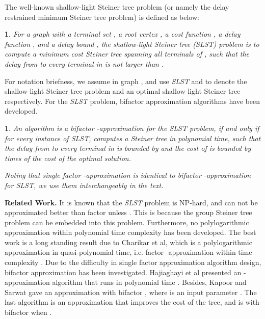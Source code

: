 \documentclass[english,runningheads,a4paper]{llncs}
\newtheorem{defn}[thm]{\protect\definitionname}
\providecommand{\definitionname}{Definition}
\begin{document}
The well-known shallow-light Steiner tree problem (or namely the delay
restrained minimum Steiner tree problem) is defined as below:
\begin{defn}
For a graph  with a terminal set , a root vertex
, a cost function , a delay function
, and a delay bound , the\emph{
shallow-light Steiner tree (SLST) problem} is to compute a minimum
cost Steiner tree  spanning all terminals of , such that
the delay from  to every terminal in  is not larger than
.
\end{defn}
For notation briefness, we assume  in graph
, and use \emph{SLST }and\emph{ } to denote the shallow-light
Steiner tree problem and an optimal shallow-light Steiner tree respectively.
 For the \emph{SLST} problem, bifactor approximation algorithms have
been developed.
\begin{defn}
An algorithm  is a bifactor -approximation
for the \emph{SLST} problem, if and only if for every instance of
\emph{SLST, } computes a Steiner tree  in polynomial time,
such that the delay from  to every terminal in  is bounded
by  and the cost of  is bounded by  times
of the cost of the optimal solution.

Noting that single factor -approximation is identical to bifactor
-approximation for \emph{SLST}, we use them
interchangeably in the text.
\end{defn}
\textbf{Related Work.} It is known that the \emph{SLST} problem is
NP-hard, and can not be approximated better than factor 
unless  \cite{khandekar2013some}.
This is because the group Steiner tree problem can be embedded into
this problem. Furthermore, no polylogarithmic approximation within
polynomial time complexity has been developed. The best work is a
long standing result due to Charikar et al, which is a polylogarithmic
approximation in quasi-polynomial time, i.e. factor-
approximation within time complexity \cite{charikar1998approximation}.
Due to the difficulty in single factor approximation algorithm design,
bifactor approximation has been investigated. Hajiaghayi et al presented
an -approximation algorithm that
runs in polynomial time \cite{hajiaghayi2006approximating}. Besides,
Kapoor and Sarwat gave an approximation with bifactor ,
where  is an input parameter \cite{kapoor2007bounded}. The last
algorithm is an approximation that improves the cost of the tree,
and is with bifactor  when  \cite{kapoor2007bounded}.
\end{document}
